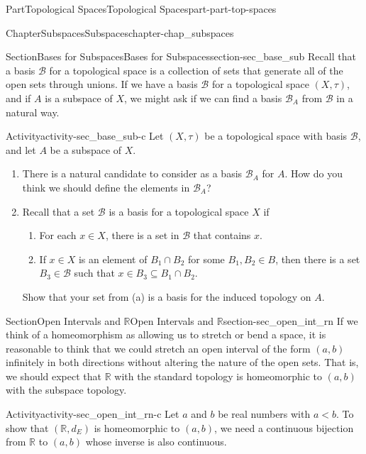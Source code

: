 \documentclass[oneside,10pt,]{book}
\numberwithin{equation}{chapter}
\newcommand{\R}{\mathbb{R}}
\newcommand{\B}{\mathcal{B}}
\newcommand{\lt}{<}
\begin{document}
\begin{partptx}{Part}{Topological Spaces}{}{Topological Spaces}{}{}{part-part-top-spaces}
\begin{chapterptx}{Chapter}{Subspaces}{}{Subspaces}{}{}{chapter-chap_subspaces}
\typeout{************************************************}
%
\begin{sectionptx}{Section}{Bases for Subspaces}{}{Bases for Subspaces}{}{}{section-sec_base_sub}
Recall that a basis \(\B\) for a topological space is a collection of sets that generate all of the open sets through unions. If we have a basis \(\B\) for a topological space \((X, \tau)\), and if \(A\) is a subspace of \(X\), we might ask if we can find a basis \(\B_A\) from \(\B\) in a natural way.%
\begin{activity}{Activity}{}{activity-sec_base_sub-c}%
Let \((X, \tau)\) be a topological space with basis \(\B\), and let \(A\) be a subspace of \(X\).%
\begin{enumerate}[font=\bfseries,label=(\alph*),ref=\alph*]%
\item{}There is a natural candidate to consider as a basis \(\B_A\) for \(A\). How do you think we should define the elements in \(\B_A\)?%
\item{}Recall that a set \(\B\) is a basis for a topological space \(X\) if%
\begin{enumerate}
\item{}For each \(x \in X\), there is a set in \(\B\) that contains \(x\).%
\item{}If \(x \in X\) is an element of \(B_1 \cap B_2\) for some \(B_1, B_2 \in B\), then there is a set \(B_3 \in \B\) such that \(x \in B_3 \subseteq B_1 \cap B_2\).%
\end{enumerate}
Show that your set from (a) is a basis for the induced topology on \(A\).%
\end{enumerate}%
\end{activity}%
\end{sectionptx}
%
%
\typeout{************************************************}
\typeout{Section  Open Intervals and \(\R\)}
\typeout{************************************************}
%
\begin{sectionptx}{Section}{Open Intervals and \(\R\)}{}{Open Intervals and \(\R\)}{}{}{section-sec_open_int_rn}
If we think of a homeomorphism as allowing us to stretch or bend a space, it is reasonable to think that we could stretch an open interval of the form \((a,b)\) infinitely in both directions without altering the nature of the open sets. That is, we should expect that \(\R\) with the standard topology is homeomorphic to \((a,b)\) with the subspace topology.%
\begin{activity}{Activity}{}{activity-sec_open_int_rn-c}%
Let \(a\) and \(b\) be real numbers with \(a \lt  b\). To show that \((\R, d_E)\) is homeomorphic to \((a,b)\), we need a continuous bijection from \(\R\) to \((a,b)\) whose inverse is also continuous.%

\end{activity}
\end{sectionptx}
\end{chapterptx}
\end{partptx}
\end{document}
